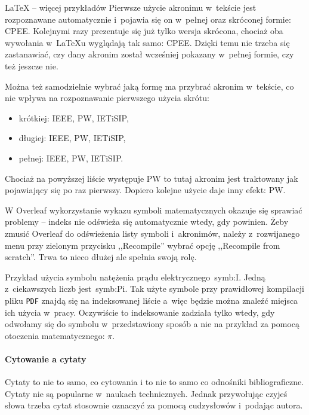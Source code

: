 \begin{easyappendix}{\LaTeX{} -- więcej przykładów}
Pierwsze użycie akronimu w~tekście jest rozpoznawane automatycznie i~pojawia się on w~pełnej oraz skróconej formie: \gls{CPEE}. Kolejnymi razy prezentuje się już tylko wersja skrócona, chociaż oba wywołania w~\LaTeX{u} wyglądają tak samo: \gls{CPEE}. Dzięki temu nie trzeba się zastanawiać, czy dany akronim został wcześniej pokazany w~pełnej formie, czy też jeszcze nie.

Można też samodzielnie wybrać jaką formę ma przybrać akronim w~tekście, co nie wpływa na rozpoznawanie pierwszego użycia skrótu:
\begin{itemize}
	\item krótkiej: \acrshort{IEEE}, \acrshort{PW}, \acrshort{IETiSIP},
	\item długiej: \acrlong{IEEE}, \acrlong{PW}, \acrlong{IETiSIP},
	\item pełnej: \acrfull{IEEE}, \acrfull{PW}, \acrfull{IETiSIP}.
\end{itemize}

Chociaż na powyższej liście występuje \gls{PW} to tutaj akronim jest traktowany jak pojawiający się po raz pierwszy. Dopiero kolejne użycie daje inny efekt: \gls{PW}.

W Overleaf wykorzystanie wykazu symboli matematycznych okazuje się sprawiać problemy -- indeks nie odświeża się automatycznie wtedy, gdy powinien. Żeby zmusić Overleaf do odświeżenia listy symboli i~akronimów, należy z~rozwijanego menu przy zielonym przycisku ,,Recompile'' wybrać opcję ,,Recompile from scratch''. Trwa to nieco dłużej ale spełnia swoją rolę.

Przykład użycia symbolu natężenia prądu elektrycznego~\gls{symb:I}. Jedną z~ciekawszych liczb jest~\gls{symb:Pi}. Tak użyte symbole przy prawidłowej kompilacji pliku \texttt{PDF} znajdą się na indeksowanej liście a~więc będzie można znaleźć miejsca ich użycia w~pracy. Oczywiście to indeksowanie zadziała tylko wtedy, gdy odwołamy się do symbolu w~przedstawiony sposób a nie na przykład za pomocą otoczenia matematycznego: $\pi$.

\paragraph{Cytowanie a cytaty}
Cytaty to nie to samo, co cytowania i to nie to samo co odnośniki bibliograficzne. Cytaty nie są popularne w~naukach technicznych. Jednak przywołując czyjeś słowa trzeba cytat stosownie oznaczyć za pomocą cudzysłowów i~podając autora.


\end{easyappendix}
